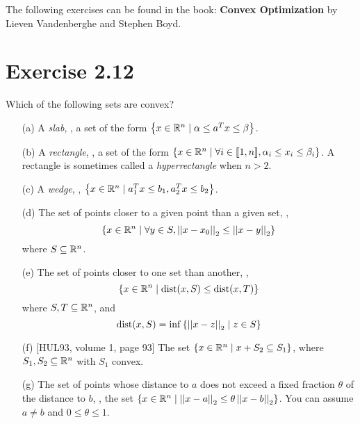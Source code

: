 \documentclass[a4paper, 11pt]{report}
\begin{document}

\maketitle

The following exercises can be found in the book: \textbf{Convex Optimization} by Lieven Vandenberghe and Stephen Boyd.

\section*{Exercise 2.12}

Which of the following sets are convex?

\begin{itemize}
	\item[(a)] A \emph{slab}, \ie, a set of the form $\left\{ x \in \mathbb{R}^{n} \mid \alpha \leq a^{T}x \leq \beta\right\}$.
	
	\item[(b)] A \emph{rectangle}, \ie, a set of the form $\left\{ x \in \mathbb{R}^{n} \mid \forall i \in [\![ 1, n ]\!], \alpha_{i} \leq x_{i} \leq \beta_{i}\right\}$. A rectangle is sometimes called a \emph{hyperrectangle} when $n > 2$.
	
	\item[(c)] A \emph{wedge}, \ie, $\left\{ x \in \mathbb{R}^{n} \mid a_{1}^{T}x \leq b_{1}, a_{2}^{T}x \leq b_{2}\right\}$.
	
	\item[(d)] The set of points closer to a given point than a given set, \ie,
	\[ \left\{ x \in \mathbb{R}^{n} \mid \forall y \in S, \left|\left| x - x_{0} \right|\right|_{2} \leq \left|\left| x - y \right|\right|_{2}\right\} \]
	\noindent where $S \subseteq \mathbb{R}^{n}$.
	
	\item[(e)] The set of points closer to one set than another, \ie,
	\[ \left\{ x \in \mathbb{R}^{n} \mid \operatorname{dist}(x, S) \leq \operatorname{dist}(x, T)\right\} \]
	\noindent where $S, T \subseteq \mathbb{R}^{n}$, and
	\[ \operatorname{dist}(x, S) = \inf \left\{ \left|\left| x - z \right|\right|_{2} \mid z \in S\right\} \]
	
	\item[(f)] [HUL93, volume 1, page 93] The set $\left\{ x \in \mathbb{R}^{n} \mid x + S_{2} \subseteq S_{1}\right\}$, where $S_{1}, S_{2} \subseteq \mathbb{R}^{n}$ with $S_{1}$ convex.
	
	\item[(g)] The set of points whose distance to $a$ does not exceed a fixed fraction $\theta$ of the distance to $b$, \ie, the set $\left\{ x \in \mathbb{R}^{n} \mid \left|\left| x - a \right|\right|_{2} \leq \theta \left|\left| x - b \right|\right|_{2}\right\}$. You can assume $a \neq b$ and $0 \leq \theta \leq 1$.
\end{itemize}
\end{document}
